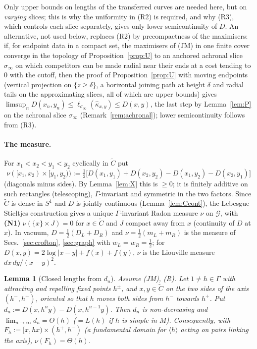 \documentclass[aps,prd,onecolumn,superscriptaddress,nofootinbib,amsmath,amssymb,11pt]{revtex4-2}
\newtheorem{lemma}[theorem]{Lemma}
\theoremstyle{definition}
\newcommand{\G}{\mathcal{G}}
\begin{document}
Only upper bounds on lengths of the transferred curves are needed here, but on \emph{varying} slices; this is why the uniformity
in (R2) is required, and why (R3), which controls each slice separately, gives only lower semicontinuity of $D$. An alternative,
not used below, replaces (R2) by precompactness of the maximisers: if, for endpoint data in a compact set, the maximisers of (JM)
in one finite cover converge in the topology of Proposition~\ref{prop:U} to an anchored achronal slice $\sigma_\infty$ on which
competitors can be made radial near their ends at a cost tending to $0$ with the cutoff, then
the proof of Proposition~\ref{prop:U} with moving endpoints (vertical projection on $\{z\ge\delta\}$, a horizontal joining path
at height $\delta$ and radial tails on the approximating slices, all of which are upper bounds) gives
$\limsup_nD(x_n,y_n)\le\ell_{\sigma_\infty}(\hat\kappa_{x,y})\le D(x,y)$, the last step by Lemma~\ref{lem:P} on the achronal slice
$\sigma_\infty$ (Remark~\ref{rem:achronal}); lower semicontinuity follows from (R3).

\paragraph*{The measure.} For $x_1<x_2<y_1<y_2$ cyclically in $\tilde C$ put
\begin{equation}\label{eq:nu}
\nu([x_1,x_2)\times[y_1,y_2)):=\tfrac12\big[D(x_1,y_1)+D(x_2,y_2)-D(x_1,y_2)-D(x_2,y_1)\big]
\end{equation}
(diagonals minus sides). By Lemma~\ref{lem:X} this is $\ge0$; it is finitely additive on such rectangles (telescoping),
$\Gamma$-invariant and symmetric in the two factors. Since $\tilde C$ is dense in $S^1$ and $D$ is jointly continuous
(Lemma~\ref{lem:Ccont}), the Lebesgue--Stieltjes construction gives a unique $\Gamma$-invariant Radon measure $\nu$ on $\G$, with
\textbf{(N1)} $\nu(\{x\}\times J)=0$ for $x\in\tilde C$ and $J$ compact away from $x$ (continuity of $D$ at $x$). In vacuum, $D=\frac12(D_L+D_R)$
and $\nu=\frac12(m_L+m_R)$ is the measure of Secs.~\ref{sec:crofton}, \ref{sec:graph} with $w_L=w_R=\frac12$; for
$D(x,y)=2\log|x-y|+f(x)+f(y)$, $\nu$ is the Liouville measure $dx\,dy/(x-y)^2$.

\begin{lemma}[Closed lengths from $d_n$]\label{lem:N3}
Assume (JM), (R). Let $1\ne h\in\Gamma$ with attracting and repelling fixed points $h^\pm$, and $x,y\in\tilde C$ on the two sides
of the axis $(h^-,h^+)$, oriented so that $h$ moves both sides from $h^-$ towards $h^+$. Put
$d_n:=D(x,h^ny)-D(x,h^{n-1}y)$. Then $d_n$ is non-decreasing and $\lim_{n\to\infty}d_n=\Theta(h)$ ($=L(h)$ if $h$ is simple in
$M$). Consequently, with $F_h:=[x,hx)\times(h^+,h^-)$ (a fundamental domain for $\langle h\rangle$ acting on pairs linking the
axis), $\nu(F_h)=\Theta(h)$.
\end{lemma}
\end{document}
